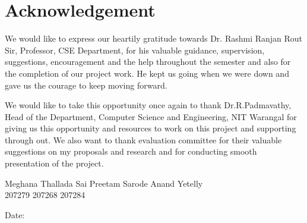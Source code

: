 \chapter*{Acknowledgement}

\par We would like to express our heartily gratitude towards Dr. Rashmi Ranjan Rout  Sir, Professor, CSE Department, for his valuable guidance, supervision, suggestions, encouragement and the help throughout the semester and also for the completion of our project work. He kept us going when we were down and gave us the courage to keep moving forward.
\par We would like to take this opportunity once again to thank Dr.R.Padmavathy, Head of the Department, Computer Science and Engineering, NIT Warangal for giving us this opportunity and resources to work on this project and supporting through out. We also want to thank evaluation committee for their valuable suggestions on my proposals and research and for conducting smooth presentation of the project.

\vspace{10em}
\begin {flushleft}

Meghana Thallada \hspace{1cm} Sai Preetam Sarode \hspace{1cm} Anand Yetelly \\
207279 \hspace{3.2cm} 207268 \hspace{3.5cm} 207284 \hspace{1cm}
\end{flushleft}
Date:
